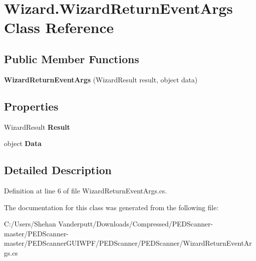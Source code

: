 \hypertarget{class_wizard_1_1_wizard_return_event_args}{}\section{Wizard.\+Wizard\+Return\+Event\+Args Class Reference}
\label{class_wizard_1_1_wizard_return_event_args}
\subsection*{Public Member Functions}
\begin{DoxyCompactItemize}
\item 
\mbox{\label{class_wizard_1_1_wizard_return_event_args_a173874e1e44724f14afc19ed6c9db718}} 
{\bfseries Wizard\+Return\+Event\+Args} (Wizard\+Result result, object data)
\end{DoxyCompactItemize}
\subsection*{Properties}
\begin{DoxyCompactItemize}
\item 
\mbox{\label{class_wizard_1_1_wizard_return_event_args_ac8ce7f3ad4a2cd81714c8b29e772dc41}} 
Wizard\+Result {\bfseries Result}
\item 
\mbox{\label{class_wizard_1_1_wizard_return_event_args_aaa15c75ee0435fceb69e6f4196b0f51a}} 
object {\bfseries Data}
\end{DoxyCompactItemize}


\subsection{Detailed Description}


Definition at line 6 of file Wizard\+Return\+Event\+Args.\+cs.



The documentation for this class was generated from the following file\+:\begin{DoxyCompactItemize}
\item 
C\+:/\+Users/\+Shehan Vanderputt/\+Downloads/\+Compressed/\+P\+E\+D\+Scanner-\/master/\+P\+E\+D\+Scanner-\/master/\+P\+E\+D\+Scanner\+G\+U\+I\+W\+P\+F/\+P\+E\+D\+Scanner/\+P\+E\+D\+Scanner/Wizard\+Return\+Event\+Args.\+cs\end{DoxyCompactItemize}
